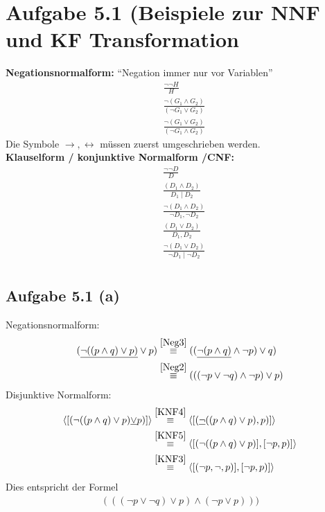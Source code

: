 \documentclass[12pt,a4paper]{article}
\author{Willi Sontopski}
\begin{document}

\section*{Aufgabe 5.1 (Beispiele zur NNF und KF Transformation}
\textbf{Negationsnormalform:} ``Negation immer nur vor Variablen''\\
\begin{align}
&\frac{\neg\neg H}{H}\label{Neg1}\\
&\frac{\neg(G_1\wedge G_2)}{(\neg G_1\vee G_2)}\label{Neg2}\\
&\frac{\neg(G_1\vee G_2)}{(\neg G_1\wedge G_2)}\label{Neg3}
\end{align}
Die Symbole $\to, \leftrightarrow$ müssen zuerst umgeschrieben werden.\\

\textbf{Klauselform / konjunktive Normalform /CNF:}\\
\begin{align}
&\frac{\neg\neg D}{D}\label{KNF1}\\
&\frac{(D_1\wedge D_2)}{D_1\mid D_2}\label{KNF2}\\
&\frac{\neg(D_1\wedge D_2)}{\neg D_1,\neg D_2}\label{KNF3}\\
&\frac{(D_1\vee D_2)}{D_1, D_2}\label{KNF4}\\
&\frac{\neg(D_1\vee D_2)}{\neg D_1\mid\neg D_2}\label{KNF5}\\
\end{align}

\subsection*{Aufgabe 5.1 (a)}
Negationsnormalform:
\begin{align*}
(\underline{\neg (( p\wedge q)\vee p)}\vee p)
&\stackrel{\ref{Neg3}}{\equiv}
((\underline{\neg(p\wedge q)}\wedge\neg p)\vee q)\\
&\stackrel{\ref{Neg2}}{\equiv}
(((\neg p\vee \neg q)\wedge\neg p)\vee p)
\end{align*}
Disjunktive Normalform:
\begin{align*}
\langle[(\neg (( p\wedge q)\vee p)\underline{\vee} p)]\rangle
&\stackrel{\ref{KNF4}}{\equiv}
\langle[(\underline{\neg} (( p\wedge q)\vee p), p)]\rangle\\
&\stackrel{\ref{KNF5}}{\equiv}
\langle[(\neg (( p\wedge q)\vee p)],[\neg p,p)]\rangle\\
&\stackrel{\ref{KNF3}}{\equiv}
\langle[(\neg p,\neg, p)],[\neg p,p)]\rangle\\
\end{align*}
Dies entspricht der Formel
\begin{align*}
(((\neg p\vee\neg q)\vee p)\wedge(\neg p\vee p)))
\end{align*}
\end{document}

